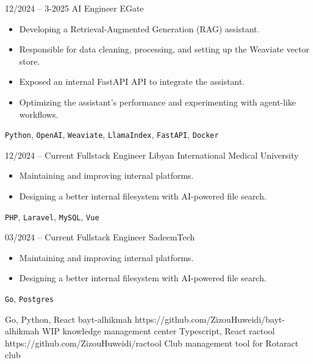 \documentclass[9pt]{developercv} %
\begin{document}
\begin{entrylist}
    \entry
    {12/2024 -- 3-2025}
    {AI Engineer}
    {EGate}
    {\vspace{-10pt}
        \begin{itemize}[noitemsep,topsep=0pt,parsep=0pt,partopsep=0pt,leftmargin=-1pt]
            \item Developing a Retrieval-Augmented Generation (RAG) assistant.
            \item Responsible for data cleaning, processing, and setting up the Weaviate vector store.
            \item Exposed an internal FastAPI API to integrate the assistant.
            \item Optimizing the assistant's performance and experimenting with agent-like workflows.
        \end{itemize}
      \texttt{Python}, \texttt{OpenAI}, \texttt{Weaviate}, \texttt{LlamaIndex}, \texttt{FastAPI}, \texttt{Docker}}
        
    \entry
    {12/2024 -- Current}
    {Fullstack Engineer}
    {Libyan International Medical University}
    {\vspace{-10pt}
        \begin{itemize}[noitemsep,topsep=0pt,parsep=0pt,partopsep=0pt,leftmargin=-1pt]
            \item Maintaining and improving internal platforms.
            \item Designing a better internal filesystem with AI-powered file search.
        \end{itemize}
        \texttt{PHP}, \texttt{Laravel}, \texttt{MySQL}, \texttt{Vue}}
    \entry
    {03/2024 -- Current}
    {Fullstack Engineer}
    {SadeemTech}
    {\vspace{-10pt}
        \begin{itemize}[noitemsep,topsep=0pt,parsep=0pt,partopsep=0pt,leftmargin=-1pt]
            \item Maintaining and improving internal platforms.
            \item Designing a better internal filesystem with AI-powered file search.
        \end{itemize}
        \texttt{Go}, \texttt{Postgres}}
\end{entrylist}

\begin{entrylist}
	\entry
	{Go, Python, React}
	{bayt-alhikmah}
	{https://github.com/ZizouHuweidi/bayt-alhikmah}
	{WIP knowledge management center}
	\entry
	{Typescript, React}
	{ractool}
	{https://github.com/ZizouHuweidi/ractool}
	{Club management tool for Rotaract club}
\end{entrylist}
\end{document}
